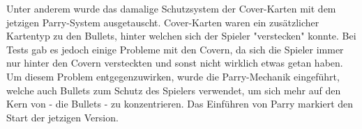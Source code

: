 Unter anderem wurde das damalige Schutzsystem der Cover-Karten mit dem jetzigen Parry-System ausgetauscht.
Cover-Karten waren ein zusätzlicher Kartentyp zu den Bullets, hinter welchen sich der Spieler "verstecken" konnte.
Bei Tests gab es jedoch einige Probleme mit den Covern, da sich die Spieler immer nur hinter den Covern versteckten
und sonst nicht wirklich etwas getan haben. Um diesem Problem entgegenzuwirken, wurde die Parry-Mechanik eingeführt,
welche auch Bullets zum Schutz des Spielers verwendet, um sich mehr auf den Kern von \FF - die Bullets - zu konzentrieren.
Das Einführen von Parry markiert den Start der jetzigen \FF Version.





\renewcommand{\kapitelautor}{}
